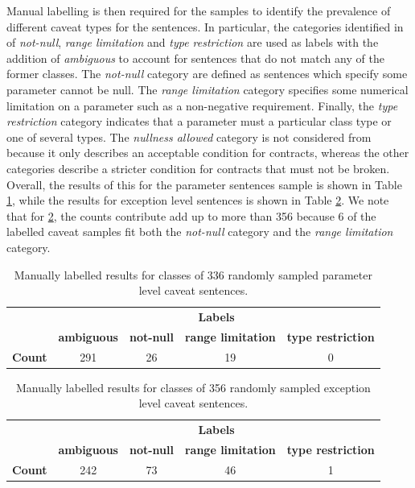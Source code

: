 Manual labelling is then required for the samples to identify the prevalence of different caveat types for the sentences. In  particular, the categories identified in \cite{zhou-directive} of \textit{not-null}, \textit{range limitation} and \textit{type restriction} are used as labels with the addition of \textit{ambiguous} to account for sentences that do not match any of the former classes. The \textit{not-null} category are defined as sentences which specify some parameter cannot be null. The \textit{range limitation} category specifies some numerical limitation on a parameter such as a non-negative requirement. Finally, the \textit{type restriction} category indicates that a parameter must a particular class type or one of several types. The \textit{nullness allowed} category is not considered from \cite{zhou-directive} because it only describes an acceptable condition for contracts, whereas the other categories describe a stricter condition for contracts that must not be broken. Overall, the results of this for the parameter sentences sample is shown in Table \ref{tab:caveat-param-stats}, while the results for exception level sentences is shown in Table \ref{tab:caveat-exception-stats}. We note that for \ref{tab:caveat-exception-stats}, the counts contribute add up to more than 356 because 6 of the labelled caveat samples fit both the \textit{not-null} category and the \textit{range limitation} category. 

\begin{table}[]
	\begin{tabular}{|l|cccc|}
		\hline
		& \multicolumn{4}{c|}{\textbf{Labels}} \\ \cline{2-5} 
		& \textbf{ambiguous} & \textbf{not-null} & \textbf{range limitation} & \textbf{type restriction} \\ \hline
		\textbf{Count} & 291 & 26 & 19 & 0 \\ \hline
	\end{tabular}
	\caption{Manually labelled results for classes of 336 randomly sampled parameter level caveat sentences.}
	\label{tab:caveat-param-stats}
\end{table}

\begin{table}[]
	\begin{tabular}{|l|cccc|}
		\hline
		& \multicolumn{4}{c|}{\textbf{Labels}} \\ \cline{2-5} 
		& \textbf{ambiguous} & \textbf{not-null} & \textbf{range limitation} & \textbf{type restriction} \\ \hline
		\textbf{Count} & 242 & 73 & 46 & 1 \\ \hline
	\end{tabular}
	\caption{Manually labelled results for classes of 356 randomly sampled exception level caveat sentences.}
	\label{tab:caveat-exception-stats}
\end{table}

